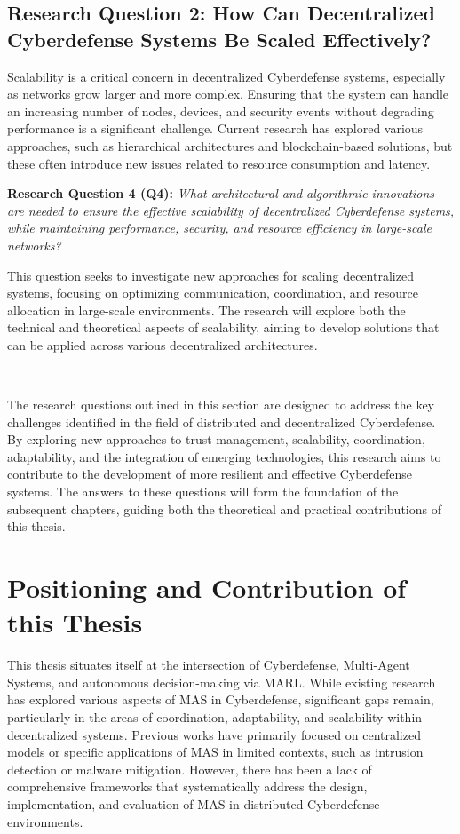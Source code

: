 \subsection{Research Question 2: How Can Decentralized Cyberdefense Systems Be Scaled Effectively?}

Scalability is a critical concern in decentralized Cyberdefense systems, especially as networks grow larger and more complex. Ensuring that the system can handle an increasing number of nodes, devices, and security events without degrading performance is a significant challenge. Current research has explored various approaches, such as hierarchical architectures and blockchain-based solutions, but these often introduce new issues related to resource consumption and latency.

\textbf{Research Question 4 (Q4):} \textit{What architectural and algorithmic innovations are needed to ensure the effective scalability of decentralized Cyberdefense systems, while maintaining performance, security, and resource efficiency in large-scale networks?}

This question seeks to investigate new approaches for scaling decentralized systems, focusing on optimizing communication, coordination, and resource allocation in large-scale environments. The research will explore both the technical and theoretical aspects of scalability, aiming to develop solutions that can be applied across various decentralized architectures.

\

The research questions outlined in this section are designed to address the key challenges identified in the field of distributed and decentralized Cyberdefense. By exploring new approaches to trust management, scalability, coordination, adaptability, and the integration of emerging technologies, this research aims to contribute to the development of more resilient and effective Cyberdefense systems. The answers to these questions will form the foundation of the subsequent chapters, guiding both the theoretical and practical contributions of this thesis.

\section{Positioning and Contribution of this Thesis}

This thesis situates itself at the intersection of Cyberdefense, Multi-Agent Systems, and autonomous decision-making via MARL. While existing research has explored various aspects of MAS in Cyberdefense, significant gaps remain, particularly in the areas of coordination, adaptability, and scalability within decentralized systems. Previous works have primarily focused on centralized models or specific applications of MAS in limited contexts, such as intrusion detection or malware mitigation. However, there has been a lack of comprehensive frameworks that systematically address the design, implementation, and evaluation of MAS in distributed Cyberdefense environments.

